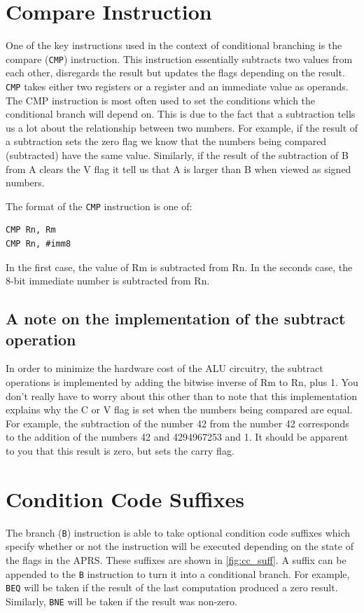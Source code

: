 \section{Compare Instruction}
One of the key instructions used in the context of conditional branching is the compare (\texttt{CMP}) instruction. This instruction essentially subtracts two values from each other, disregards the result but updates the flags depending on the result. \texttt{CMP} takes either two registers or a register and an immediate value as operands. The CMP instruction is most often used to set the conditions which the conditional branch will depend on. This is due to the fact that a subtraction tells us a lot about the relationship between two numbers. For example, if the result of a subtraction sets the zero flag we know that the numbers being compared (subtracted) have the same value. Similarly, if the result of the subtraction of B from A clears the V flag it tell us that A is larger than B when viewed as signed numbers. 

The format of the \texttt{CMP} instruction is one of:
\begin{lstlisting}[fontadjust=true,frame=trBL]
CMP Rn, Rm
CMP Rn, #imm8
\end{lstlisting}
In the first case, the value of Rm is subtracted from Rn. In the seconds case, the 8-bit immediate number is subtracted from Rn.

\subsection{A note on the implementation of the subtract operation}
In order to minimize the hardware cost of the ALU circuitry, the subtract operations is implemented by adding the bitwise inverse of Rm to Rn, plus 1. You don't really have to worry about this other than to note that this implementation explains why the C or V flag is set when the numbers being compared are equal. For example, the subtraction of the number 42 from the number 42 corresponds to the addition of the numbers 42 and 4294967253 and 1. It should be apparent to you that this result is zero, but sets the carry flag. 


\section{Condition Code Suffixes} 
The branch (\texttt{B}) instruction is able to take optional condition code suffixes which specify whether or not the instruction will be executed depending on the state of the flags in the APRS. 
These suffixes are shown in \autoref{fig:cc_suff}. A suffix can be appended to the \texttt{B} instruction to turn it into a conditional branch. For example, \texttt{BEQ} will be taken if the result of the last computation produced a zero result. Similarly, \texttt{BNE} will be taken if the result was non-zero. 

